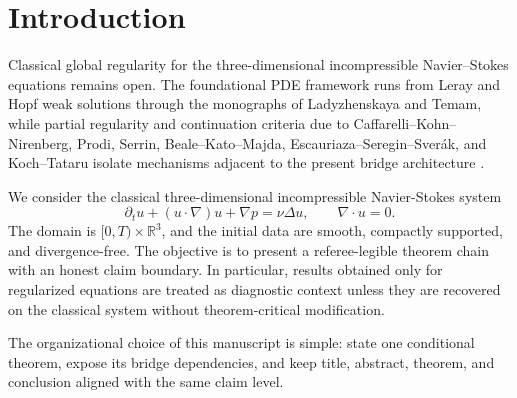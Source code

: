 \section{Introduction}

Classical global regularity for the three-dimensional incompressible Navier--Stokes equations remains open. The foundational PDE framework runs from Leray and Hopf weak solutions through the monographs of Ladyzhenskaya and Temam, while partial regularity and continuation criteria due to Caffarelli--Kohn--Nirenberg, Prodi, Serrin, Beale--Kato--Majda, Escauriaza--Seregin--Sver\'ak, and Koch--Tataru isolate mechanisms adjacent to the present bridge architecture \cite{Leray1934,Hopf1951,Ladyzhenskaya1969,Temam2001,CaffarelliKohnNirenberg1982,Prodi1959,Serrin1962,BealeKatoMajda1984,EscauriazaSereginSverak2003,KochTataru2001}.

We consider the classical three-dimensional incompressible Navier-Stokes system
\begin{equation}
\partial_t u + (u\cdot\nabla)u + \nabla p = \nu\Delta u,\qquad \nabla\cdot u = 0.
\end{equation}
The domain is \([0,T)\times\mathbb{R}^3\), and the initial data are smooth, compactly supported, and divergence-free. The objective is to present a referee-legible theorem chain with an honest claim boundary. In particular, results obtained only for regularized equations are treated as diagnostic context unless they are recovered on the classical system without theorem-critical modification.

The organizational choice of this manuscript is simple: state one conditional theorem, expose its bridge dependencies, and keep title, abstract, theorem, and conclusion aligned with the same claim level.
